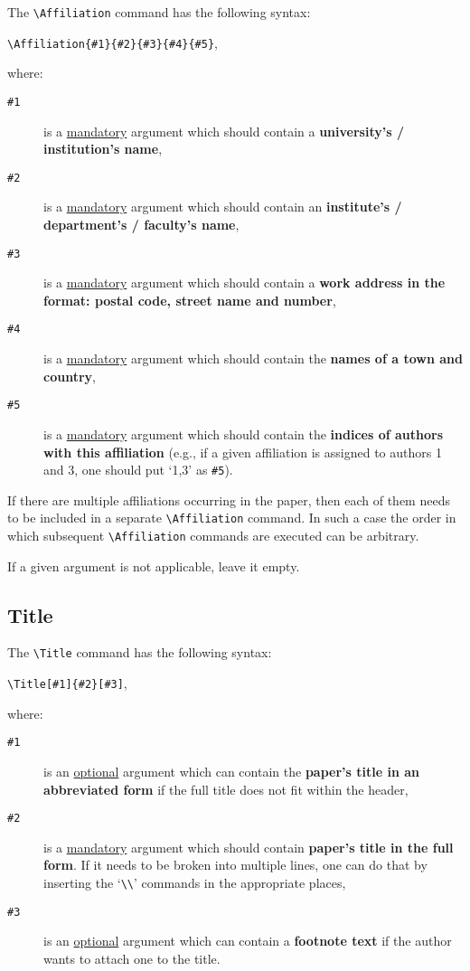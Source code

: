 \documentclass[manuscript]{BSLstyle} %
\begin{document}
The \texttt{\textbackslash Affiliation} command has the following syntax:
\begin{center}
	\texttt{\textbackslash Affiliation\{\#1\}\{\#2\}\{\#3\}\{\#4\}\{\#5\}},
\end{center}
where:
\begin{description}
	\item[\texttt{\#1}] is a \underline{mandatory} argument which should contain a \textbf{university's / institution's name},
	\item[\texttt{\#2}] is a \underline{mandatory} argument which should contain an \textbf{institute's / department's / faculty's name},
	\item[\texttt{\#3}] is a \underline{mandatory} argument which should contain a \textbf{work address in the format: postal code, street name and number},
	\item[\texttt{\#4}] is a \underline{mandatory} argument which should contain the \textbf{names of a town and country},
	\item[\texttt{\#5}] is a \underline{mandatory} argument which should contain the \textbf{indices of authors with this affiliation} (e.g., if a given affiliation is assigned to authors 1 and 3, one should put `1,3' as \texttt{\#5}).
\end{description}
If there are multiple affiliations occurring in the paper, then each of them needs to be included in a separate \texttt{\textbackslash Affiliation} command. In such a case the order in which subsequent \texttt{\textbackslash Affiliation} commands are executed can be arbitrary.

If a given argument is not applicable, leave it empty.

\subsection{Title}

The \texttt{\textbackslash Title} command has the following syntax:
\begin{center}
	\texttt{\textbackslash Title[\#1]\{\#2\}[\#3]},
\end{center}
where:
\begin{description}
	\item[\texttt{\#1}] is an \underline{optional} argument which can contain the \textbf{paper's title in an abbreviated form} if the full title does not fit within the header,
	\item[\texttt{\#2}] is a \underline{mandatory} argument which should contain\textbf{ paper's title in the full form}. If it needs to be broken into multiple lines, one can do that by inserting the `\texttt{\textbackslash\textbackslash}' commands in the appropriate places,
	\item[\texttt{\#3}] is an \underline{optional} argument which can contain a \textbf{footnote text} if the author wants to attach one to the title.
\end{description}
\end{document}
